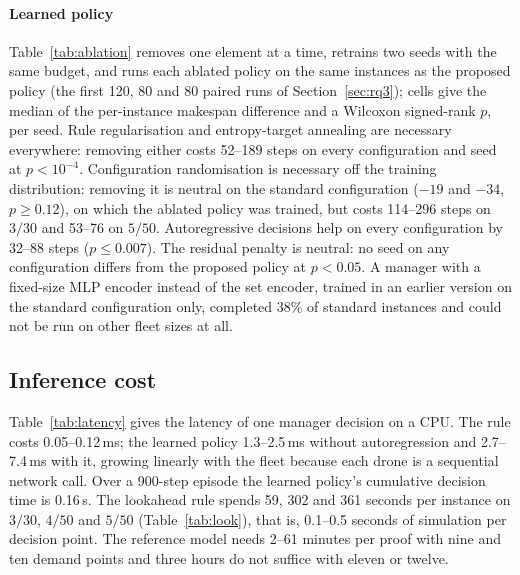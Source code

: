 \documentclass[final,5p,times,twocolumn]{elsarticle}
\begin{document}
\paragraph{Learned policy}
Table~\ref{tab:ablation} removes one element at a time, retrains two seeds with the same budget,
and runs each ablated policy on the same instances as the proposed policy (the first 120, 80 and
80 paired runs of Section~\ref{sec:rq3}); cells give the median of the per-instance makespan
difference and a Wilcoxon signed-rank $p$, per seed. Rule regularisation and entropy-target
annealing are necessary everywhere: removing either costs 52--189 steps on every configuration
and seed at $p<10^{-4}$. Configuration randomisation is necessary off the training distribution:
removing it is neutral on the standard configuration ($-19$ and $-34$, $p \ge 0.12$), on which
the ablated policy was trained, but costs 114--296 steps on $3/30$ and 53--76 on $5/50$.
Autoregressive decisions help on every configuration by 32--88 steps ($p \le 0.007$). The
residual penalty is neutral: no seed on any configuration differs from the proposed policy at
$p<0.05$. A manager with a fixed-size MLP encoder instead of the set encoder, trained in an
earlier version on the standard configuration only, completed 38\% of standard instances and could
not be run on other fleet sizes at all.

\begin{table}[t]
\centering
\caption{Ablation of the learned policy. Each cell gives, for two independently trained seeds,
the median per-instance makespan difference between the ablated policy and the proposed policy on
the same instances (positive: the removed element was needed) and the Wilcoxon signed-rank $p$.}
\label{tab:ablation}
\footnotesize

\end{table}

\subsection{Inference cost}
\label{sec:cost}

Table~\ref{tab:latency} gives the latency of one manager decision on a CPU. The rule costs
0.05--0.12\,ms; the learned policy 1.3--2.5\,ms without autoregression and 2.7--7.4\,ms with it,
growing linearly with the fleet because each drone is a sequential network call. Over a 900-step
episode the learned policy's cumulative decision time is 0.16\,s. The lookahead rule spends 59,
302 and 361 seconds per instance on $3/30$, $4/50$ and $5/50$ (Table~\ref{tab:look}), that is,
0.1--0.5 seconds of simulation per decision point. The reference model needs 2--61 minutes per
proof with nine and ten demand points and three hours do not suffice with eleven or twelve.
\end{document}

